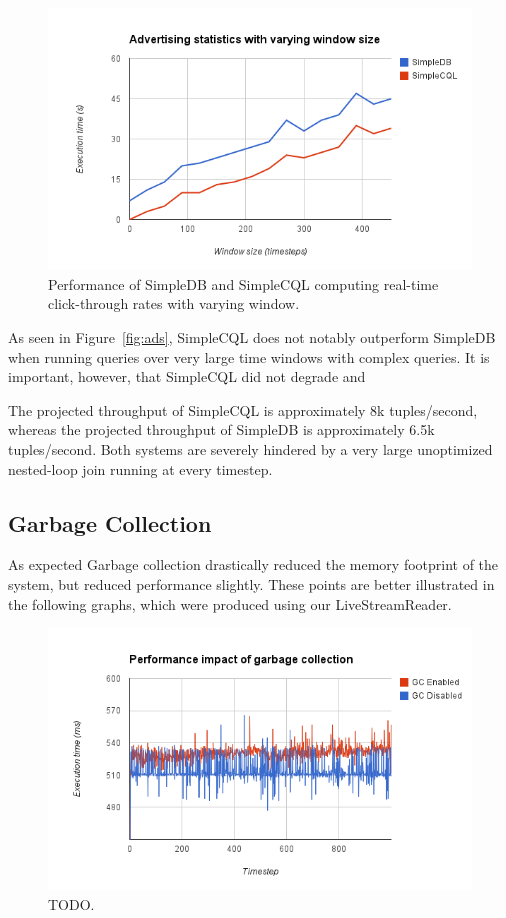 \documentclass[a4paper, 10pt, conference]{IEEEconf}
\begin{document}
\begin{figure}[tpH!]
    \centering
    \centerline{\includegraphics[totalheight=5cm]{ads_window.png}}
    \caption{Performance of SimpleDB and SimpleCQL computing real-time click-through rates with varying window.}
    \label{fig:ads_window}
\end{figure}

As seen in Figure~\ref{fig:ads}, SimpleCQL does not notably outperform SimpleDB when running queries over very large time windows with complex queries.  It is important, however, that SimpleCQL did not degrade and 

The projected throughput of SimpleCQL is approximately 8k tuples/second, whereas the projected throughput of SimpleDB is approximately 6.5k tuples/second.  Both systems are severely hindered by a very large unoptimized nested-loop join running at every timestep.

\subsection{Garbage Collection}
As expected Garbage collection drastically reduced the memory footprint of the system, but reduced performance slightly. These points are better illustrated in the following graphs, which were produced using our LiveStreamReader.

\begin{figure}[tpH!]
    \centering
    \centerline{\includegraphics[totalheight=5cm]{gc_perf.png}}
    \caption{TODO.}
    \label{fig:gc_perf}
\end{figure}
\end{document}
